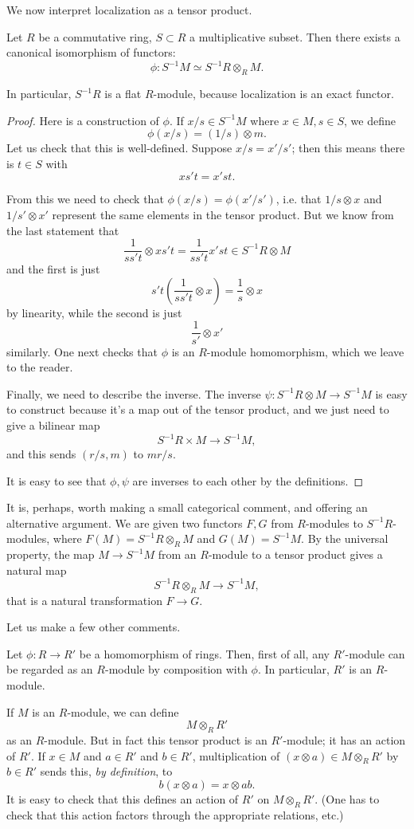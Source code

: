 We now interpret localization as a tensor product.
\begin{theorem} 
Let $R$ be a commutative ring, $S \subset R$ a multiplicative subset. Then there
exists a canonical isomorphism of functors:
\[ \phi:  S^{-1}M \simeq S^{-1 }R \otimes_R M . \]
\end{theorem} 
In particular, $S^{-1}R $ is a flat $R$-module, because localization is an
exact functor. 
\begin{proof} 
Here is a construction of $\phi$. If $x/s \in S^{-1}M$ where $x \in M, s \in
S$, we define
\[ \phi(x/s) = (1/s) \otimes m.  \]
Let us check that this is well-defined. Suppose $x/s = x'/s'$; then this means
there is $t \in S$ with 
\[ xs't = x'st . \]

From this we need to check that $\phi(x/s) = \phi(x'/s')$, i.e. that $1/s
\otimes x$ and $1/s' \otimes x'$ represent the same elements in the tensor
product. But we know from the last statement that
\[ \frac{1}{ss't} \otimes xs't = \frac{1}{ss't} x'st \in S^{-1}R \otimes M \]
and the first is just
\[ s't( \frac{1}{ss't} \otimes x) = \frac{1}{s} \otimes x  \]
by linearity, while the second is just
\[ \frac{1}{s'} \otimes x'  \]
similarly. One next checks that $\phi$ is an $R$-module homomorphism, which we
leave to the reader.

Finally, we need to describe the inverse. The inverse $\psi: S^{-1}R \otimes M
\to S^{-1}M$ is easy to construct because it's a map out of the tensor product,
and we just need to give a bilinear map
\[ S^{-1} R \times M \to S^{-1}M , \]
and this sends $(r/s, m)$ to $mr/s$. 

It is easy to see that $\phi, \psi$ are inverses to each other by the
definitions. 	
\end{proof} 

It is, perhaps, worth making a small categorical comment, and offering an
alternative argument.
We are given two functors $F,G$ from $R$-modules to $S^{-1}R$-modules, where
$F(M) = S^{-1}R \otimes_R M$ and $G(M) = S^{-1}M$.
By the universal property, the map $M \to S^{-1}M$ from an $R$-module to a
tensor product gives  a natural map
\[ S^{-1}R \otimes_R M \to S^{-1}M,  \]
that is a natural transformation $F \to G$.
	


Let us make a few other comments.

\begin{remark} 
Let $\phi: R \to R'$ be a homomorphism of rings. Then, first of all, any
$R'$-module can be regarded as an $R$-module by composition with $\phi$. In
particular, $R'$ is an $R$-module.

If $M$ is an $R$-module, we can define
\[ M \otimes_R R'  \]
as an $R$-module. But in fact this tensor product is an $R'$-module; it has
an action of $R'$.   If $x \in M$ and $a \in R'$ and $b \in R'$, multiplication
of $(x \otimes a) \in M \otimes_R R'$ by $b \in R'$ sends this, \emph{by
definition}, to 
\[ b(x \otimes a) = x \otimes ab.  \]
It is easy to check that this defines an action of $R'$ on $M \otimes_R R'$.
(One has to check that this action factors through the appropriate relations,
etc.)

\end{remark} 

